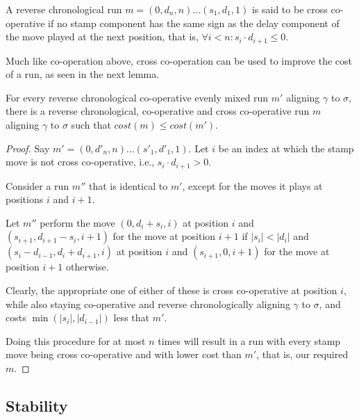 \documentclass[runningheads]{llncs}
\begin{document}
    \begin{definition}
      A reverse chronological run ${m = (0, d_n, n) \dots (s_1, d_1, 1)}$ is said to be cross co-operative if no stamp component has the same sign as the delay component of the move played at the next position, that is, $\forall i < n : s_i \cdot d_{i+1} \leq 0$. 
    \end{definition}
    
    Much like co-operation above, cross co-operation can be used to improve the cost of a run, as seen in the next lemma. 
    
    \begin{lemma}\label{crosscoop}
      For every reverse chronological co-operative evenly mixed run $m'$ aligning $\gamma$ to $\sigma$, there is a reverse chronological, co-operative and cross co-operative run $m$ aligning $\gamma$ to $\sigma$ such that $cost(m) \leq cost(m')$. 
    \end{lemma}

    \begin{proof}
        Say $m' = (0, d'_n, n) \dots (s'_1, d'_1, 1)$. 
        Let $i$ be an index at which the stamp move is not cross co-operative, i.e., $s_i \cdot d_{i+1} > 0$. 
        
        Consider a run $m''$ that is identical to $m'$, except for the moves it plays at positions $i$ and $i+1$.   
        
        Let $m''$ perform the move $(0, d_i + s_i, i)$ at position $i$ and $(s_{i+1}, d_{i+1} - s_{i}, i+1)$ for the move at position $i+1$ if $|s_i| < |d_i|$ and $(s_i - d_{i-1}, d_i + d_{i+1}, i)$ at position $i$ and $(s_{i+1}, 0, i+1)$ for the move at position $i+1$ otherwise. 
        
        Clearly, the appropriate one of either of these is cross co-operative at position $i$, while also staying co-operative and reverse chronologically aligning $\gamma$ to $\sigma$, and costs $\min(|s_i|, |d_{i-1}|)$ less that $m'$. 
        
        Doing this procedure for at most $n$ times will result in a run with every stamp move being cross co-operative and with lower cost than $m'$, that is, our required $m$. 
        \end{proof}
  \subsection{Stability}
    
\end{document}
